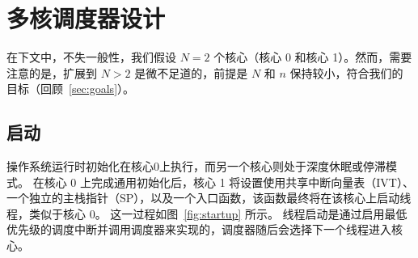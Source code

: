 \section{\OSname{} 多核调度器设计}
\label{sec:design-overview}
在下文中，不失一般性，我们假设 $N=2$ 个核心（核心 0 和核心 1）。然而，需要注意的是，扩展到 $N>2$ 是微不足道的，前提是 $N$ 和 $n$ 保持较小，符合我们的目标（回顾~\autoref{sec:goals}）。


\subsection{启动}

\OSname{} 操作系统运行时初始化在核心0上执行，而另一个核心则处于深度休眠或停滞模式。
在核心 0 上完成通用初始化后，核心 1 将设置使用共享中断向量表（IVT）、一个独立的主栈指针（SP），以及一个入口函数，该函数最终将在该核心上启动线程，类似于核心 0。
这一过程如图~\ref{fig:startup} 所示。
线程启动是通过启用最低优先级的调度中断并调用调度器来实现的，调度器随后会选择下一个线程进入核心。


